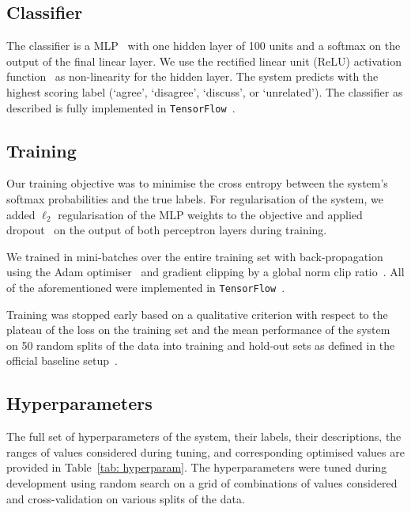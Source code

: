 \documentclass{article}
\begin{document}
\subsection{Classifier}

The classifier is a MLP~\cite{mlp} with one hidden layer of 100 units and a softmax on the output of the final linear layer. We use the rectified linear unit (ReLU) activation function~\cite{relu} as non-linearity for the hidden layer. The system predicts with the highest scoring label (`agree', `disagree', `discuss', or `unrelated'). The classifier as described is fully implemented in \texttt{TensorFlow}~\cite{tensorflow}.

\subsection{Training}

Our training objective was to minimise the cross entropy between the system's softmax probabilities and the true labels. For regularisation of the system, we added $\ell_{2}$ regularisation of the MLP weights to the objective and applied dropout~\cite{drop} on the output of both perceptron layers during training.

We trained in mini-batches over the entire training set with back-propagation using the Adam optimiser~\cite{adam} and gradient clipping by a global norm clip ratio~\cite{grad}. All of the aforementioned were implemented in \texttt{TensorFlow}~\cite{tensorflow}.

Training was stopped early based on a qualitative criterion with respect to the plateau of the loss on the training set and the mean performance of the system on 50 random splits of the data into training and hold-out sets as defined in the official baseline setup~\cite{fncbase}.

\subsection{Hyperparameters}

The full set of hyperparameters of the system, their labels, their descriptions, the ranges of values considered during tuning, and corresponding optimised values are provided in Table~\ref{tab: hyperparam}.
The hyperparameters were tuned during development using random search on a grid of combinations of values considered and cross-validation on various splits of the data.
\end{document}
